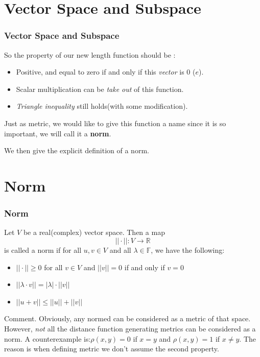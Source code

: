 \documentclass[12pt, t]{beamer}
\renewcommand{\emph}[1]{{\color{Turquoise3}\textsl{#1}}}
\begin{document}
\section{Vector Space and Subspace}
\begin{frame}
    \frametitle{Vector Space and Subspace}
So the property of our new length function should be :
\begin{itemize}
    \item Positive, and equal to zero if and only if this \emph{vector} is 0 ($e$).
    \item Scalar multiplication can be \emph{take out} of this function.
    \item \emph{Triangle inequality} still holds(with some modification). 
\end{itemize}
\vspace{1em}
Just as metric, we would like to give this function a name since it is so important, we will call it a \textbf{norm}.

\vspace{1em}
We then give the explicit definition of a norm.
\end{frame}

\section{Norm}
\begin{frame}
    \frametitle{Norm}
\hspace{1em} 
Let $V$ be a real(complex) vector space. Then a map 
\begin{equation*}
    ||\cdot||:V\rightarrow \mathbb{R}
\end{equation*}
is called a norm if for all $u,v\in V$ and all $\lambda\in\mathbb{F}$, we have the following:
\begin{itemize}
    \item $||\cdot||\geq 0$ for all $v\in V$ and $||v||=0$ if and only if $v=0$
    \item $||\lambda\cdot v||=|\lambda|\cdot ||v||$
    \item $||u+v||\leq ||u||+||v||$
\end{itemize}
\vspace{1em}
Comment.  Obviously, any normed can be considered as a metric of that space. However, \emph{not} all the distance function generating metrics can be 
considered as a norm. A counterexample is:$\rho(x,y)=0$ if $x=y$ and $\rho(x,y)=1$ if $x\neq y$. The reason is when defining metric we don't assume 
the second property.
    
\end{frame}
\end{document}
